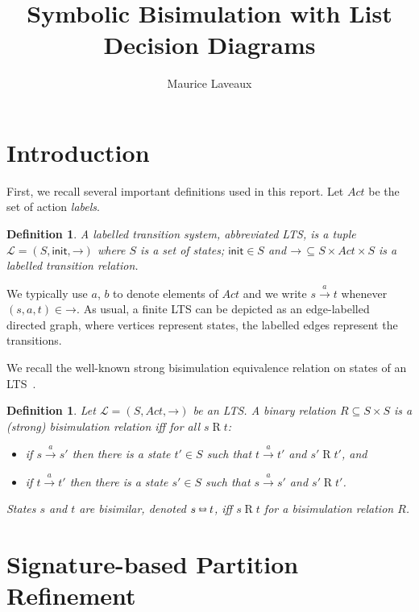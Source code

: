 \documentclass[a4paper]{article}
\title{Symbolic Bisimulation with List Decision Diagrams}
\author{Maurice Laveaux}
\newcommand{\init}{\textsf{init}}
\newcommand{\lts}{\mathcal{L}}
\newcommand{\states}{S}
\newcommand{\actions}{\mathit{Act}}
\newcommand{\action}{a}
\newcommand{\transitions}{\mathbin{\rightarrow}}
\newcommand{\transition}[1]{\xrightarrow{#1}}
\newcommand{\bisim}{\mathbin{\leftrightarroweq}}
\newcommand{\related}{\mathbin{R}}
\newtheorem{definition}[theorem]{Definition}
\begin{document}
\maketitle
\section{Introduction}

First, we recall several important definitions used in this report.
Let $\actions$ be the set of action \emph{labels}.

\begin{definition}
  A labelled transition system, abbreviated LTS, is a tuple $\lts = (\states, \init, \transitions)$ where $\states$ is a set of states; $\init \in \states$ and $\transitions\,\subseteq \states \times \actions \times \states$ is a labelled transition relation.
\end{definition}

We typically use $\action$, $b$ to denote elements of $\actions$ and we write $s \transition{\action} t$ whenever $(s, \action, t) \in \transitions$.
As usual, a finite LTS can be depicted as an edge-labelled directed graph, where vertices represent states, the labelled edges represent the transitions.

We recall the well-known strong bisimulation equivalence relation on states of an LTS~\cite{Milner83}.

\begin{definition}
  Let $\lts = (\states, \actions, \transitions)$ be an LTS.
  A binary relation $R \subseteq \states \times \states$ is a \emph{(strong) bisimulation relation} iff for all $s \related t$:
  \begin{itemize}
 		\item if $s \transition{\action} s'$ then there is a state $t' \in \states$ such that $t \transition{\action} t'$ and $s' \related t'$, and
 		
 		\item if $t \transition{\action} t'$ then there is a state $s' \in \states$ such that $s \transition{\action} s'$ and $s' \related t'$.
  \end{itemize}

  \noindent
  States $s$ and $t$ are \emph{bisimilar}, denoted $s \bisim t$, iff $s \related t$ for a bisimulation relation $\related$.
\end{definition}

\section{Signature-based Partition Refinement}
\end{document}

